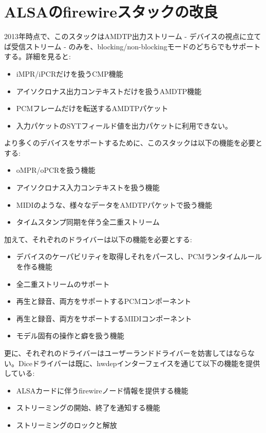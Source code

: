 \documentclass[onecolumn]{jarticle}
\begin{document}
\section{ALSAのfirewireスタックの改良}

2013年時点で、このスタックはAMDTP出力ストリーム - デバイスの視点に立てば受信ストリーム - のみを、blocking/non-blockingモードのどちらでもサポートする。詳細を見ると:

\begin{itemize}
\item iMPR/iPCRだけを扱うCMP機能
\item アイソクロナス出力コンテキストだけを扱うAMDTP機能
\item PCMフレームだけを転送するAMDTPパケット
\item 入力パケットのSYTフィールド値を出力パケットに利用できない。
\end{itemize}

より多くのデバイスをサポートするために、このスタックは以下の機能を必要とする:
\begin{itemize}
\item oMPR/oPCRを扱う機能
\item アイソクロナス入力コンテキストを扱う機能
\item MIDIのような、様々なデータをAMDTPパケットで扱う機能
\item タイムスタンプ同期を伴う全二重ストリーム
\end{itemize}

加えて、それぞれのドライバーは以下の機能を必要とする:
\begin{itemize}
\item デバイスのケーパビリティを取得しそれをパースし、PCMランタイムルールを作る機能
\item 全二重ストリームのサポート
\item 再生と録音、両方をサポートするPCMコンポーネント
\item 再生と録音、両方をサポートするMIDIコンポーネント
\item モデル固有の操作と癖を扱う機能
\end{itemize}

更に、それぞれのドライバーはユーザーランドドライバーを妨害してはならない。Diceドライバーは既に、hwdepインターフェイスを通じて以下の機能を提供している:
\begin{itemize}
\item ALSAカードに伴うfirewireノード情報を提供する機能
\item ストリーミングの開始、終了を通知する機能
\item ストリーミングのロックと解放
\end{itemize}
\end{document}
